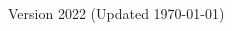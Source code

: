\documentclass[aspectratio=169]{beamer}
\subtitle[Statistical Inference]{Topic 03 - Statistical Inference}
\date{}
\begin{document}
\begin{CJK}{UTF8}{ipxm}

\begin{frame}
  \maketitle

  \vfill

  \hfill \tiny{Version 2022 (Updated \today)}
\end{frame}










\end{CJK}
\end{document}
